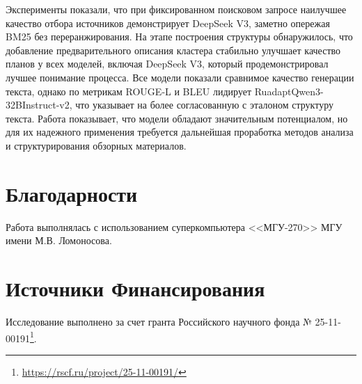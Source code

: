 \documentclass{article}
\begin{document}
Эксперименты показали, что при фиксированном поисковом запросе наилучшее качество отбора источников демонстрирует DeepSeek V3, 
заметно опережая BM25 без переранжирования.
На этапе построения структуры обнаружилось, что добавление предварительного описания кластера стабильно улучшает качество планов у всех моделей, включая DeepSeek V3, который продемонстрировал лучшее понимание процесса.
Все модели показали сравнимое качество генерации текста, однако по метрикам ROUGE-L и BLEU лидирует RuadaptQwen3-\allowbreak 32BInstruct-v2, что указывает на более согласованную с эталоном структуру текста.
Работа показывает, что модели обладают значительным потенциалом, 
но для их надежного применения требуется дальнейшая проработка методов анализа и структурирования обзорных материалов.

\section*{Благодарности}
Работа выполнялась с использованием суперкомпьютера <<МГУ-270>> МГУ имени М.В. Ломоносова.

\section*{Источники Финансирования}
Исследование выполнено за счет гранта Российского научного фонда № 25-11-00191\footnote{\url{https://rscf.ru/project/25-11-00191/}}.
\end{document}
